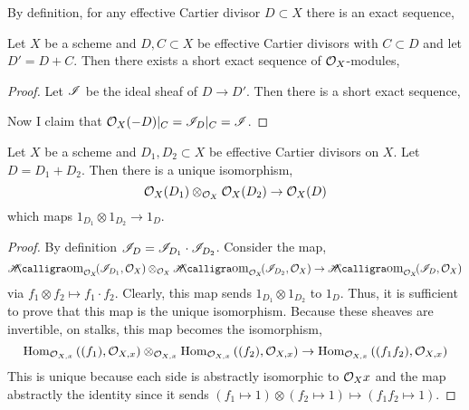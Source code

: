 \documentclass[12pt]{article}
\begin{document}
\begin{rmk}
By definition, for any effective Cartier divisor $D \subset X$ there is an exact sequence,
\begin{center}
\end{center}
\end{rmk}

\begin{lemma}
Let $X$ be a scheme and $D, C \subset X$ be effective Cartier divisors with $C \subset D$ and let $D' = D + C$. Then there exists a short exact sequence of $\mathcal{O}_{X}$-modules,
\begin{center}
\end{center}
\end{lemma}

\begin{proof}
Let $\mathscr{I}$ be the ideal sheaf of $D \to D'$. Then there is a short exact sequence,
\begin{center}
\end{center}
Now I claim that $\mathcal{O}_{X}(-D) |_C = \mathscr{I}_D |_C = \mathscr{I}$. 
\end{proof}

\begin{lemma}
Let $X$ be a scheme and $D_1, D_2 \subset X$ be effective Cartier divisors on $X$. Let $D = D_1 + D_2$. Then there is a unique isomorphism,
\[ \mathcal{O}_{X}(D_1) \otimes_{\mathcal{O}_{X}} \mathcal{O}_{X}(D_2) \to \mathcal{O}_{X}(D) \]
which maps $1_{D_1} \otimes 1_{D_2} \to 1_D$.
\end{lemma}

\begin{proof}
By definition $\mathscr{I}_D = \mathscr{I}_{D_1} \cdot \mathscr{I}_{D_2}$. Consider the map,
\[ \shHomover{\struct{X}}{\I_{D_1}}{\struct{X}} \otimes_{\struct{X}} \shHomover{\struct{X}}{\I_{D_2}}{\struct{X}} \to \shHomover{\struct{X}}{\I_{D}}{\struct{X}} \]
via $f_1 \otimes f_2 \mapsto f_1 \cdot f_2$. Clearly, this map sends $1_{D_1} \otimes 1_{D_2}$ to $1_D$. Thus, it is sufficient to prove that this map is the unique isomorphism. Because these sheaves are invertible, on stalks, this map becomes the isomorphism,
\[ \mathrm{Hom}_{\mathcal{O}_{X, x}} \left( (f_1), \mathcal{O}_{X, x} \right) \otimes_{\mathcal{O}_{X, x}} \mathrm{Hom}_{\mathcal{O}_{X, x}} \left( (f_2), \mathcal{O}_{X, x} \right) \to \mathrm{Hom}_{\mathcal{O}_{X, x}} \left( (f_1 f_2), \mathcal{O}_{X, x} \right) \]
This is unique because each side is abstractly isomorphic to $\mathcal{O}_{X}{x}$ and the map abstractly the identity since it sends $(f_1 \mapsto 1) \otimes (f_2 \mapsto 1) \mapsto (f_1 f_2 \mapsto 1)$. 
\end{proof}
\end{document}

